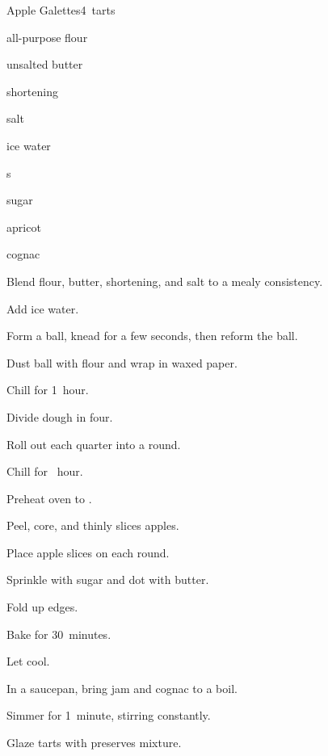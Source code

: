 \begin{recipe}{Apple Galettes}{}{4~tarts}

\begin{ingredients}
\item \C{1\quarter} all-purpose flour
\item {} unsalted butter
\item {} shortening
\item \tp{\quarter} salt
\item {} ice water
\item {}s
\item sugar
\item \C{\half} apricot 
\item {} cognac
\end{ingredients}

\begin{directions}
\item Blend flour, butter, shortening, and salt to a mealy consistency.
\item Add ice water.
\item Form a ball, knead for a few seconds, then reform the ball.
\item Dust ball with flour and wrap in waxed paper.
\item Chill for 1~hour.
\item Divide dough in four.
\item Roll out each quarter into a  round.
\item Chill for \half~hour.
\item Preheat oven to .
\item Peel, core, and thinly slices apples.
\item Place apple slices on each round.
\item Sprinkle with sugar and dot with butter.
\item Fold up edges.
\item Bake for 30~minutes.
\item Let cool.
\item In a saucepan, bring jam and cognac to a boil.
\item Simmer for 1~minute, stirring constantly.
\item Glaze tarts with preserves mixture.
\end{directions}

\end{recipe}
